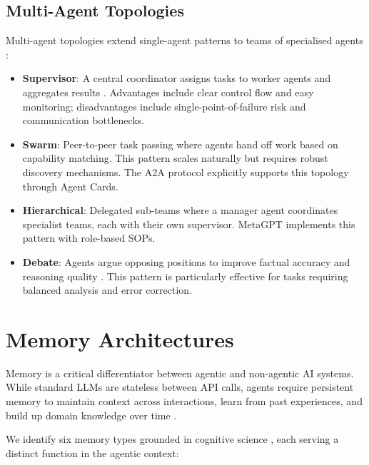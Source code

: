 \documentclass[review]{elsarticle}
\theoremstyle{definition}
\begin{document}
\subsection{Multi-Agent Topologies}

Multi-agent topologies extend single-agent patterns to teams of specialised agents \citep{guo2024large,talebirad2023multiagent}:

\begin{itemize}
    \item \textbf{Supervisor}: A central coordinator assigns tasks to worker agents and aggregates results \citep{wu2023autogen}. Advantages include clear control flow and easy monitoring; disadvantages include single-point-of-failure risk and communication bottlenecks.
    \item \textbf{Swarm}: Peer-to-peer task passing where agents hand off work based on capability matching. This pattern scales naturally but requires robust discovery mechanisms. The A2A protocol \citep{google2024a2a} explicitly supports this topology through Agent Cards.
    \item \textbf{Hierarchical}: Delegated sub-teams where a manager agent coordinates specialist teams, each with their own supervisor. MetaGPT \citep{hong2023metagpt} implements this pattern with role-based SOPs.
    \item \textbf{Debate}: Agents argue opposing positions to improve factual accuracy and reasoning quality \citep{du2023improving,chan2024chateval}. This pattern is particularly effective for tasks requiring balanced analysis and error correction.
\end{itemize}

\section{Memory Architectures}\label{sec:memory}

Memory is a critical differentiator between agentic and non-agentic AI systems. While standard LLMs are stateless between API calls, agents require persistent memory to maintain context across interactions, learn from past experiences, and build up domain knowledge over time \citep{zhang2024survey_memory}.

We identify six memory types grounded in cognitive science \citep{sumers2024cognitive}, each serving a distinct function in the agentic context:
\end{document}

